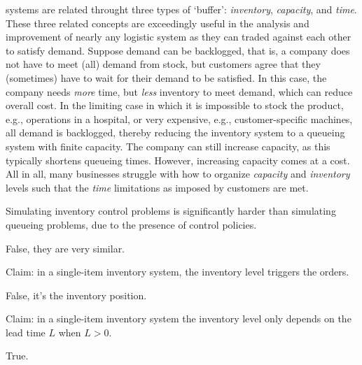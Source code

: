 \documentclass[stochastic-or.tex]{subfiles}
\begin{document}
 systems are related throught three types of `buffer': \emph{inventory}, \emph{capacity}, and \emph{time}.
These three related concepts are exceedingly useful
in the analysis and improvement of nearly any logistic system as they can traded against each other to satisfy demand.
Suppose demand can be backlogged, that is, a company does not have to meet (all) demand from stock, but customers agree that they (sometimes) have to wait for their demand to be satisfied.
In this case, the company needs \emph{more} time, but \emph{less} inventory to meet demand, which can reduce overall cost.
In the limiting case in which it is impossible to stock the product, e.g., operations in a hospital, or very expensive, e.g., customer-specific machines, all demand is backlogged, thereby reducing the inventory system to a queueing system with finite capacity.
The company can still increase capacity, as this typically shortens queueing times.
However, increasing capacity comes at a cost.
All in all, many businesses struggle with how to organize \emph{capacity} and \emph{inventory} levels such that the \emph{time} limitations as imposed by customers are met.





\begin{truefalse}
    Simulating inventory control problems is significantly harder than simulating queueing problems, due to the presence of control policies.
\begin{solution}
        False,  they are very similar.
\end{solution}
\end{truefalse}

\begin{truefalse}
Claim: in a single-item inventory system, the inventory level triggers the orders.
\begin{solution}
        False, it's the inventory position.
\end{solution}
\end{truefalse}

\begin{truefalse}
Claim: in a single-item inventory system the inventory level only depends on the lead time $L$ when $L>0$.
\begin{solution}
        True.
\end{solution}
\end{truefalse}
\end{document}
